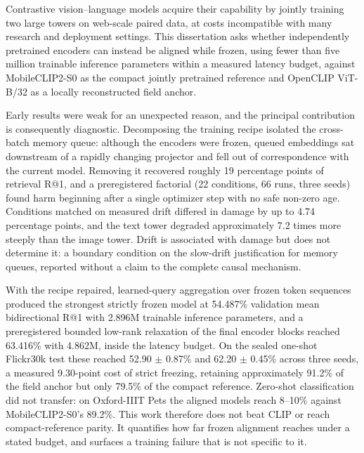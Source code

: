 Contrastive vision--language models acquire their capability by jointly training two large towers on web-scale paired data, at costs incompatible with many research and deployment settings. This dissertation asks whether independently pretrained encoders can instead be aligned while frozen, using fewer than five million trainable inference parameters within a measured latency budget, against MobileCLIP2-S0 as the compact jointly pretrained reference and OpenCLIP ViT-B/32 as a locally reconstructed field anchor.

Early results were weak for an unexpected reason, and the principal contribution is consequently diagnostic. Decomposing the training recipe isolated the cross-batch memory queue: although the encoders were frozen, queued embeddings sat downstream of a rapidly changing projector and fell out of correspondence with the current model. Removing it recovered roughly 19 percentage points of retrieval R@1, and a preregistered factorial (22 conditions, 66 runs, three seeds) found harm beginning after a single optimizer step with no safe non-zero age. Conditions matched on measured drift differed in damage by up to 4.74 percentage points, and the text tower degraded approximately 7.2 times more steeply than the image tower. Drift is associated with damage but does not determine it: a boundary condition on the slow-drift justification for memory queues, reported without a claim to the complete causal mechanism.

With the recipe repaired, learned-query aggregation over frozen token sequences produced the strongest strictly frozen model at 54.487\% validation mean bidirectional R@1 with 2.896M trainable inference parameters, and a preregistered bounded low-rank relaxation of the final encoder blocks reached 63.416\% with 4.862M, inside the latency budget. On the sealed one-shot Flickr30k test these reached 52.90 $\pm$ 0.87\% and 62.20 $\pm$ 0.45\% across three seeds, a measured 9.30-point cost of strict freezing, retaining approximately 91.2\% of the field anchor but only 79.5\% of the compact reference. Zero-shot classification did not transfer: on Oxford-IIIT Pets the aligned models reach 8--10\% against MobileCLIP2-S0's 89.2\%. This work therefore does not beat CLIP or reach compact-reference parity. It quantifies how far frozen alignment reaches under a stated budget, and surfaces a training failure that is not specific to it.
